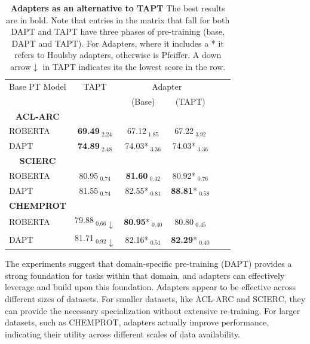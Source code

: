 \documentclass[10pt,twocolumn,letterpaper]{article}
\begin{document}
\begin{table}[H]
    \centering
    \begin{tabular}{@{}lccccc@{}}
    \hline
    Base PT Model & TAPT & \multicolumn{2}{c}{Adapter} \\
    \cmidrule(lr){2-2} \cmidrule(lr){3-4}
    & & (Base) & (TAPT) \\
    \multicolumn{1}{c}{\textbf{ACL-ARC}} \\
    ROBERTA & \textbf{69.49}$_{\text{ 2.24}}$ & 67.12$_{\text{ 1.85}}$ & 67.22$_{\text{ 3.92}}$ \\
     DAPT & \textbf{74.89}$_{\text{ 2.48}}$ & 74.03*$_{\text{ 3.36}}$ & 74.03*$_{\text{ 3.36}}$ \\
    \hline
    \multicolumn{1}{c}{\textbf{SCIERC}}\\
    ROBERTA & 80.95$_{\text{ 0.74}}$ & \textbf{81.60}$_{\text{ 0.42}}$ & 80.92*$_{\text{ 0.76}}$ \\
    DAPT & 81.55$_{\text{ 0.74}}$ & 82.55*$_{\text{ 0.81}}$ & \textbf{88.81}*$_{\text{ 0.58}}$ \\
    \hline
    \multicolumn{1}{c}{\textbf{CHEMPROT}}\\
    ROBERTA & 79.88$_{\text{ 0.66}}\downarrow$ & \textbf{80.95}*$_{\text{ 0.40}}$ & 80.80$_{\text{ 0.45}}$ \\
    DAPT & 81.71$_{\text{ 0.92}}\downarrow$ & 82.16*$_{\text{ 0.51}}$ & \textbf{82.29}*$_{\text{ 0.40}}$ \\
\end{tabular}
\caption{\textbf{Adapters as an alternative to TAPT} The best results are in bold. Note that entries in the matrix that fall for both DAPT and TAPT have three phases of pre-training (base, DAPT and TAPT). For Adapters, where it includes a * it refers to Houlsby adapters, otherwise is Pfeiffer. A down arrow$\downarrow$ in TAPT indicates its the lowest score in the row.}
\label{table:adapters_vs_tapt}
\end{table}

The experiments suggest that domain-specific pre-training (DAPT) provides a strong foundation for tasks within that domain, and adapters can effectively leverage and build upon this foundation. Adapters appear to be effective across different sizes of datasets. For smaller datasets, like ACL-ARC and SCIERC, they can provide the necessary specialization without extensive re-training. For larger datasets, such as CHEMPROT, adapters actually improve performance, indicating their utility across different scales of data availability.
\end{document}
